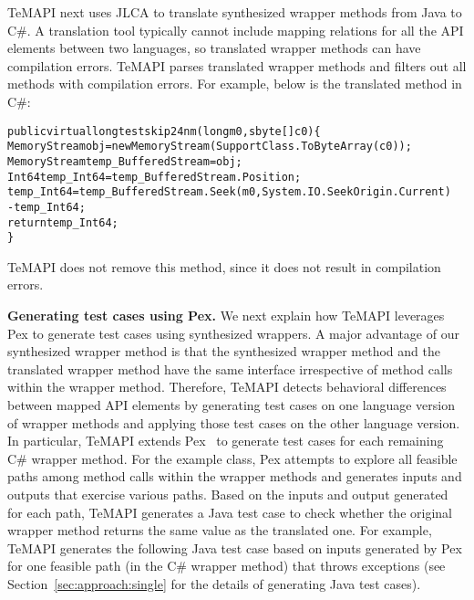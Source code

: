 TeMAPI next uses JLCA to translate synthesized wrapper methods from Java to C\#. A translation tool typically cannot include mapping relations for all the API elements between two languages, so translated wrapper methods can have compilation errors. TeMAPI parses translated wrapper methods and filters out all methods with compilation errors. For example, below is the translated  method in C\#:

\begin{CodeOut}%
\begin{alltt}
public virtual long testskip24nm(long m0, sbyte[] c0)\{
  MemoryStream obj = new MemoryStream(SupportClass.ToByteArray(c0));
  MemoryStream temp_BufferedStream = obj;
  Int64 temp_Int64 = temp_BufferedStream.Position;
  temp_Int64 = temp_BufferedStream.Seek(m0, System.IO.SeekOrigin.Current)
               - temp_Int64;
  return temp_Int64;
\}
\end{alltt}
\end{CodeOut}%

TeMAPI does not remove this method, since it does not result in compilation errors.

\textbf{Generating test cases using Pex.} We next explain how TeMAPI leverages Pex to generate test cases using synthesized wrappers. A major advantage of our synthesized wrapper method is that the synthesized wrapper method and the translated wrapper method have the same interface irrespective of method calls within the wrapper method. Therefore, TeMAPI detects behavioral differences between mapped API elements by generating test cases on one language version of wrapper methods and applying those test cases on the other language version. In particular, TeMAPI extends Pex~\cite{tillmann2008pex} to generate test cases for each remaining C\# wrapper method. For the example class, Pex attempts to explore all feasible paths among method calls within the wrapper methods and generates inputs and outputs that exercise various paths. Based on the inputs and output generated for each path, TeMAPI generates a Java test case to check whether the original wrapper method returns the same value as the translated one. For example, TeMAPI generates the following Java test case based on inputs generated by Pex for one feasible path (in the C\# wrapper method) that throws exceptions (see Section~\ref{sec:approach:single} for the details of generating Java test cases).

